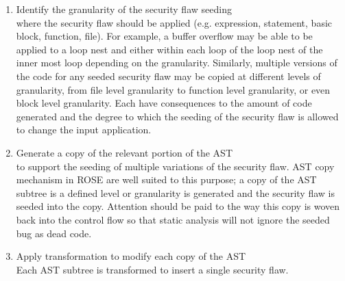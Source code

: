 \begin{enumerate}
               \item Identify the granularity of the security flaw seeding \\ 
                     where the security flaw should be applied
                     (e.g. expression, statement, basic block, function, file).
                     For example, a buffer overflow may be able to be applied to a loop
                     nest and either within each loop of the loop nest of the inner most
                     loop depending on the granularity.  Similarly, multiple versions
                     of the code for any seeded security flaw may be copied at different
                     levels of granularity, from file level granularity to function
                     level granularity, or even block level granularity.  Each have
                     consequences to the amount of code generated and the degree to which
                     the seeding of the security flaw is allowed to change the input
                     application.

               \item Generate a copy of the relevant portion of the AST \\
                     to support the seeding of multiple variations of the security flaw.
                     AST copy mechanism in ROSE are well suited to this purpose; a copy of
                     the AST subtree is a defined level or granularity is generated and
                     the security flaw is seeded into the copy. Attention should be
                     paid to the way this copy is woven back into the control flow so that
                     static analysis will not ignore the seeded bug as dead code.

               \item Apply transformation to modify each copy of the AST \\
                     Each AST subtree is transformed to insert a single security flaw.

            \end{enumerate}

